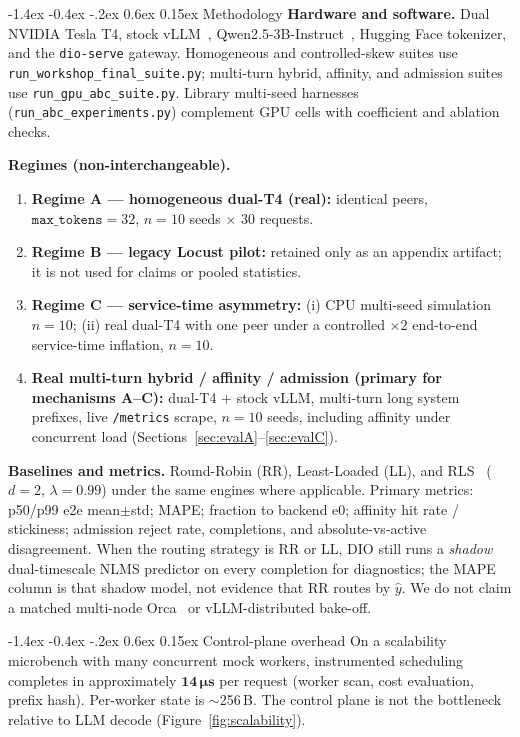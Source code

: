 \documentclass[pdflatex,sn-mathphys-num]{sn-jnl}
\makeatletter
\renewcommand{\subsection}{\@startsection{subsection}{2}{\z@}%
  {-1.4ex \@plus -0.4ex \@minus -.2ex}%
  {0.6ex \@plus 0.15ex}%
  {\needspace{3.5\baselineskip}\normalfont\normalsize\bfseries}}%
\makeatother
\begin{document}
\subsection{Methodology}
\label{sec:method}
\textbf{Hardware and software.} Dual NVIDIA Tesla T4, stock vLLM~\cite{vllm},
Qwen2.5-3B-Instruct~\cite{qwen25}, Hugging Face tokenizer, and the
\texttt{dio-serve} gateway. Homogeneous and controlled-skew suites use
\texttt{run\_workshop\_final\_suite.py}; multi-turn hybrid, affinity, and admission
suites use \texttt{run\_gpu\_abc\_suite.py}. Library multi-seed harnesses
(\texttt{run\_abc\_experiments.py}) complement GPU cells with coefficient and
ablation checks.

\textbf{Regimes (non-interchangeable).}
\begin{enumerate}
\item \textbf{Regime A --- homogeneous dual-T4 (real):}
  identical peers, $\texttt{max\_tokens}{=}32$, $n{=}10$ seeds $\times$ 30 requests.
\item \textbf{Regime B --- legacy Locust pilot:} retained only as an appendix
  artifact; it is not used for claims or pooled statistics.
\item \textbf{Regime C --- service-time asymmetry:}
  (i) CPU multi-seed simulation $n{=}10$; (ii) real dual-T4 with one peer under a
  controlled $\times 2$ end-to-end service-time inflation, $n{=}10$.
\item \textbf{Real multi-turn hybrid / affinity / admission (primary for mechanisms
  A--C):}
  dual-T4 + stock vLLM, multi-turn long system prefixes, live \texttt{/metrics}
  scrape, $n{=}10$ seeds, including affinity under concurrent load
  (Sections~\ref{sec:evalA}--\ref{sec:evalC}).
\end{enumerate}

\textbf{Baselines and metrics.} Round-Robin (RR), Least-Loaded (LL), and
RLS~\cite{haykin2002adaptive} ($d{=}2$, $\lambda{=}0.99$) under the same engines
where applicable. Primary metrics: p50/p99 e2e mean$\pm$std; MAPE; fraction to
backend e0; affinity hit rate / stickiness; admission reject rate, completions, and
absolute-vs-active disagreement. When the routing strategy is RR or LL, DIO still
runs a \emph{shadow} dual-timescale NLMS predictor on every completion for
diagnostics; the MAPE column is that shadow model, not evidence that RR routes by
$\hat{y}$. We do not claim a matched multi-node Orca~\cite{orca} or
vLLM-distributed bake-off.

\subsection{Control-plane overhead}
\label{sec:overhead}
On a scalability microbench with many concurrent mock workers, instrumented
scheduling completes in approximately $\mathbf{14\,\mu s}$ per request (worker scan,
cost evaluation, prefix hash). Per-worker state is $\sim$256\,B. The control plane is
not the bottleneck relative to LLM decode (Figure~\ref{fig:scalability}).
\end{document}
